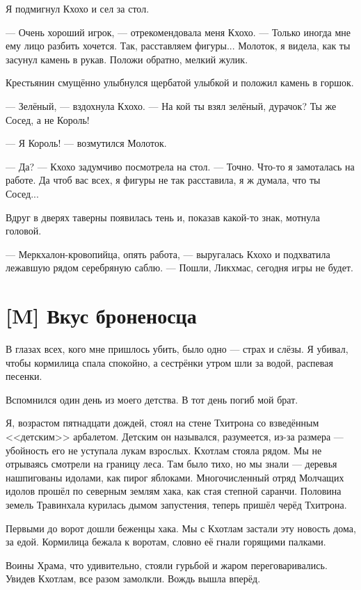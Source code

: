 Я подмигнул Кхохо и сел за стол.

--- Очень хороший игрок, --- отрекомендовала меня Кхохо.
--- Только иногда мне ему лицо разбить хочется.
Так, расставляем фигуры...
Молоток, я видела, как ты засунул камень в рукав.
Положи обратно, мелкий жулик.

Крестьянин смущённо улыбнулся щербатой улыбкой и положил камень в горшок.

--- Зелёный, --- вздохнула Кхохо.
--- На кой ты взял зелёный, дурачок?
Ты же Сосед, а не Король!

--- Я Король! --- возмутился Молоток.

--- Да? --- Кхохо задумчиво посмотрела на стол.
--- Точно.
Что-то я замоталась на работе.
Да чтоб вас всех, я фигуры не так расставила, я ж думала, что ты Сосед...

Вдруг в дверях таверны появилась тень и, показав какой-то знак, мотнула головой.

--- Меркхалон-кровопийца, опять работа, --- выругалась Кхохо и подхватила лежавшую рядом серебряную саблю.
--- Пошли, Ликхмас, сегодня игры не будет.

\section{[M] Вкус броненосца}

\textspace

В глазах всех, кого мне пришлось убить, было одно --- страх и слёзы.
Я убивал, чтобы кормилица спала спокойно, а сестрёнки утром шли за водой, распевая песенки.

Вспомнился один день из моего детства.
В тот день погиб мой брат.

Я, возрастом пятнадцати дождей, стоял на стене Тхитрона со взведённым <<детским>> арбалетом.
Детским он назывался, разумеется, из-за размера --- убойность его не уступала лукам взрослых.
Кхотлам стояла рядом.
Мы не отрываясь смотрели на границу леса.
Там было тихо, но мы знали --- деревья нашпигованы идолами, как пирог яблоками.
Многочисленный отряд Молчащих идолов прошёл по северным землям хака, как стая степной саранчи.
Половина земель Травинхала курилась дымом запустения, теперь пришёл черёд Тхитрона.

Первыми до ворот дошли беженцы хака.
Мы с Кхотлам застали эту новость дома, за едой.
Кормилица бежала к воротам, словно её гнали горящими палками.

Воины Храма, что удивительно, стояли гурьбой и жаром переговаривались.
Увидев Кхотлам, все разом замолкли.
Вождь вышла вперёд.

